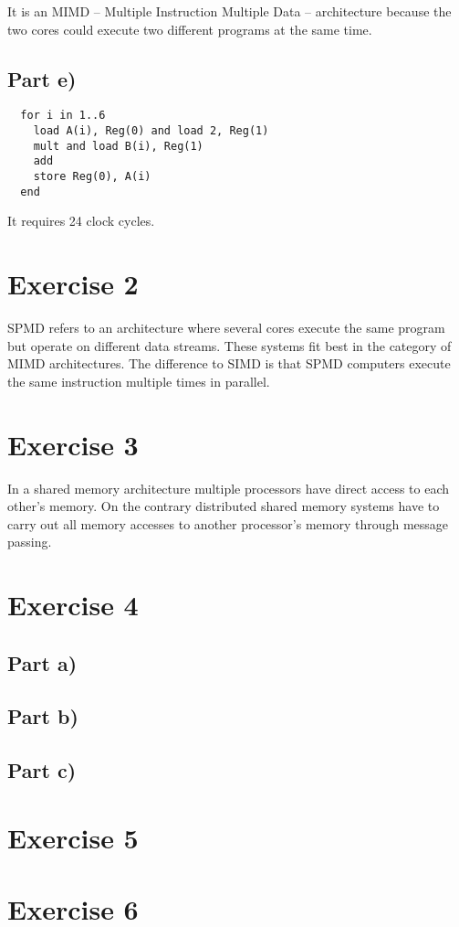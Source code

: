\documentclass[10pt,a4paper]{article}
\begin{document}
It is an MIMD -- Multiple Instruction Multiple Data -- architecture because the two cores could execute two different programs at the same time.

\subsection*{Part e)}

\begin{verbatim}
  for i in 1..6
    load A(i), Reg(0) and load 2, Reg(1)
    mult and load B(i), Reg(1)
    add
    store Reg(0), A(i)
  end
\end{verbatim}

It requires 24 clock cycles.

\section*{Exercise 2}

SPMD refers to an architecture where several cores execute the same program but operate on different data streams.
These systems fit best in the category of MIMD architectures.
The difference to SIMD is that SPMD computers execute the same instruction multiple times in parallel.

\section*{Exercise 3}

In a shared memory architecture multiple processors have direct access to each other's memory.
On the contrary distributed shared memory systems have to carry out all memory accesses to another processor's memory through message passing.

\section*{Exercise 4}

\subsection*{Part a)}

\subsection*{Part b)}

\subsection*{Part c)}

\section*{Exercise 5}

\section*{Exercise 6}
\end{document}
